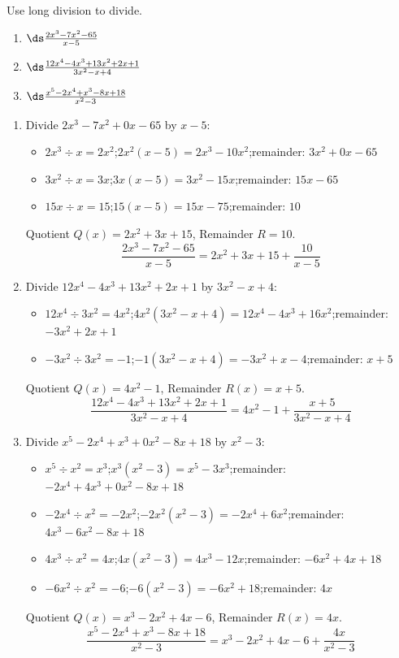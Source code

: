 \documentclass{ximera}
\begin{document}
\begin{problem}
Use long division to divide.
\begin{enumerate}
  \item[(a)] $\ds\frac{2x^3 - 7x^2 - 65}{x-5}$
  \medskip
  \item[(b)] $\ds\frac{12x^4 - 4x^3+13x^2+2x+1}{3x^2 - x + 4}$
  \medskip
  \item[(c)] $\ds\frac{x^5 - 2x^4+x^3 - 8x + 18}{x^2 - 3}$
\end{enumerate}

\begin{solution}
\begin{enumerate}
  \item[(a)] Divide $2x^3-7x^2+0x-65$ by $x-5$:
  \begin{itemize}
    \item $2x^3 \div x = 2x^2$;\quad $2x^2(x-5) = 2x^3-10x^2$;\quad remainder: $3x^2+0x-65$
    \item $3x^2 \div x = 3x$;\quad $3x(x-5) = 3x^2-15x$;\quad remainder: $15x-65$
    \item $15x \div x = 15$;\quad $15(x-5) = 15x-75$;\quad remainder: $10$
  \end{itemize}
  Quotient $Q(x) = 2x^2+3x+15$, Remainder $R = 10$.
  $$\frac{2x^3-7x^2-65}{x-5} = 2x^2+3x+15+\frac{10}{x-5}$$

  \item[(b)] Divide $12x^4-4x^3+13x^2+2x+1$ by $3x^2-x+4$:
  \begin{itemize}
    \item $12x^4 \div 3x^2 = 4x^2$;\quad $4x^2(3x^2-x+4) = 12x^4-4x^3+16x^2$;\quad remainder: $-3x^2+2x+1$
    \item $-3x^2 \div 3x^2 = -1$;\quad $-1(3x^2-x+4) = -3x^2+x-4$;\quad remainder: $x+5$
  \end{itemize}
  Quotient $Q(x) = 4x^2-1$, Remainder $R(x) = x+5$.
  $$\frac{12x^4-4x^3+13x^2+2x+1}{3x^2-x+4} = 4x^2-1+\frac{x+5}{3x^2-x+4}$$

  \item[(c)] Divide $x^5-2x^4+x^3+0x^2-8x+18$ by $x^2-3$:
  \begin{itemize}
    \item $x^5 \div x^2 = x^3$;\quad $x^3(x^2-3) = x^5-3x^3$;\quad remainder: $-2x^4+4x^3+0x^2-8x+18$
    \item $-2x^4 \div x^2 = -2x^2$;\quad $-2x^2(x^2-3) = -2x^4+6x^2$;\quad remainder: $4x^3-6x^2-8x+18$
    \item $4x^3 \div x^2 = 4x$;\quad $4x(x^2-3) = 4x^3-12x$;\quad remainder: $-6x^2+4x+18$
    \item $-6x^2 \div x^2 = -6$;\quad $-6(x^2-3) = -6x^2+18$;\quad remainder: $4x$
  \end{itemize}
  Quotient $Q(x) = x^3-2x^2+4x-6$, Remainder $R(x) = 4x$.
  $$\frac{x^5-2x^4+x^3-8x+18}{x^2-3} = x^3-2x^2+4x-6+\frac{4x}{x^2-3}$$
\end{enumerate}
\end{solution}
\end{problem}
\end{document}

